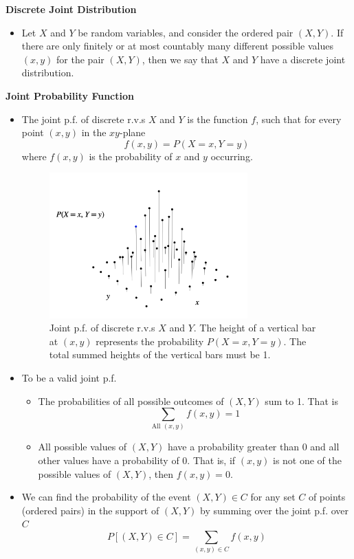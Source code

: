 \documentclass[11pt]{article}
\begin{document}
\textbf{Discrete Joint Distribution}
\begin{itemize}
    \item Let $X$ and $Y$ be random variables, and consider the ordered pair $(X,Y)$. If there
    are only finitely or at most countably many different possible values $(x,y)$ for the pair 
    $(X,Y)$, then we say that $X$ and $Y$ have a discrete joint distribution.
\end{itemize}

\textbf{Joint Probability Function}
\begin{itemize}
    \item The joint p.f. of discrete r.v.s $X$ and $Y$ is the function $f$, such that for every 
    point $(x,y)$ in the $xy$-plane
    \[f(x,y)=P(X=x, Y=y)\]
    where $f(x,y)$ is the probability of $x$ and $y$ occurring.
    \begin{figure}[H] 
        \centering 
        \includegraphics[width=3in]{imgs/joint_pf.png}
        \caption{Joint p.f. of discrete r.v.s $X$ and $Y$. The height of a vertical bar at 
        $(x,y)$ represents the probability $P(X=x, Y=y)$. The total summed heights of the vertical
        bars must be 1.}
    \end{figure}
    \item To be a valid joint p.f.
    \begin{itemize}
        \item The probabilities of all possible outcomes of $(X,Y)$ sum to 1. That is
        \[\sum_{\text{All } (x,y)} f(x,y) = 1\]
        \item All possible values of $(X,Y)$ have a probability greater than 0 and all other 
        values have a probability of 0. That is, if $(x,y)$ is not one of the possible values 
        of $(X,Y)$, then $f(x,y)=0$.
    \end{itemize}
    \item We can find the probability of the event $(X,Y) \in C$ for any set $C$ of points 
    (ordered pairs) in the support of $(X,Y)$ by summing over the joint p.f. over $C$
    \[P[(X,Y) \in C] = \sum_{(x,y) \in C} f(x,y)\]
\end{itemize}
\end{document}
